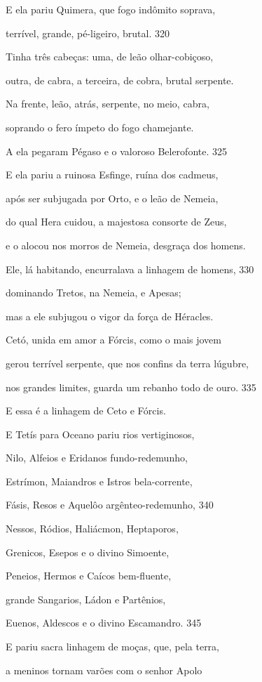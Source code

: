 E ela pariu Quimera, que fogo indômito soprava,

terrível, grande, pé-ligeiro, brutal. \num{320}

Tinha três cabeças: uma, de leão olhar-cobiçoso,

outra, de cabra, a terceira, de cobra, brutal serpente.

Na frente, leão, atrás, serpente, no meio, cabra,

soprando o fero ímpeto do fogo chamejante.

A ela pegaram Pégaso e o valoroso Belerofonte. \num{325}

E ela pariu a ruinosa Esfinge, ruína dos cadmeus,

após ser subjugada por Orto, e o leão de Nemeia,

do qual Hera cuidou, a majestosa consorte de Zeus,

e o alocou nos morros de Nemeia, desgraça dos homens.

Ele, lá habitando, encurralava a linhagem de homens, \num{330}

dominando Tretos, na Nemeia, e Apesas;

mas a ele subjugou o vigor da força de Héracles.

\quad{}Cetó, unida em amor a Fórcis, como o mais jovem

gerou terrível serpente, que nos confins da terra lúgubre,

nos grandes limites, guarda um rebanho todo de ouro. \num{335}

\medskip

E essa é a linhagem de Ceto e Fórcis.

E Tetís para Oceano pariu rios vertiginosos,

Nilo, Alfeios e Eridanos fundo-redemunho,

Estrímon, Maiandros e Istros bela-corrente,

Fásis, Resos e Aquelôo argênteo-redemunho, \num{340}

Nessos, Ródios, Haliácmon, Heptaporos,

Grenicos, Esepos e o divino Simoente,

Peneios, Hermos e Caícos bem-fluente,

grande Sangarios, Ládon e Partênios,

Euenos, Aldescos e o divino Escamandro. \num{345}

E pariu sacra linhagem de moças, que, pela terra,

a meninos tornam varões com o senhor Apolo

